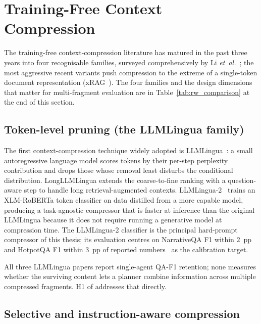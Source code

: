 \section{Training-Free Context Compression}
\label{sec:rw_compression}

The training-free context-compression literature has matured in
the past three years into four recognisable families, surveyed
comprehensively by Li \emph{et~al.}~\cite{li2025promptsurvey}; the
most aggressive recent variants push compression to the extreme of
a single-token document representation
(xRAG~\cite{cheng2024xrag}). The four families and the design
dimensions that matter for multi-fragment evaluation are in
Table~\ref{tab:rw_comparison} at the end of this section.

\subsection{Token-level pruning (the LLMLingua family)}

The first context-compression technique widely adopted is
LLMLingua~\cite{jiang2023llmlingua}: a small autoregressive language
model scores tokens by their per-step perplexity contribution and
drops those whose removal least disturbs the conditional distribution. LongLLMLingua
\cite{jiang2024longllmlingua} extends the coarse-to-fine ranking
with a question-aware step to handle long retrieval-augmented
contexts. LLMLingua-2~\cite{pan2024llmlingua2} trains an
XLM-RoBERTa token classifier on data distilled from a more
capable model, producing a task-agnostic compressor that is
faster at inference than the original LLMLingua because it does
not require running a generative model at compression time. The
LLMLingua-2 classifier is the principal hard-prompt compressor of
this thesis; its evaluation centres on NarrativeQA F1
within $2$~pp and HotpotQA F1 within $3$~pp of reported
numbers~\cite{kocisky2018narrativeqa, yang2018hotpotqa} as the
calibration target.

All three LLMLingua papers report
single-agent QA-F1 retention; none measures whether the surviving
content lets a planner combine information across multiple compressed
fragments. H1 of  addresses that directly.

\subsection{Selective and instruction-aware compression}

